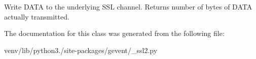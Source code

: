 \begin{DoxyVerb}Write DATA to the underlying SSL channel.  Returns
number of bytes of DATA actually transmitted.\end{DoxyVerb}
 

The documentation for this class was generated from the following file\+:\begin{DoxyCompactItemize}
\item 
venv/lib/python3./site-\/packages/gevent/\+\_\+ssl2.\+py\end{DoxyCompactItemize}
